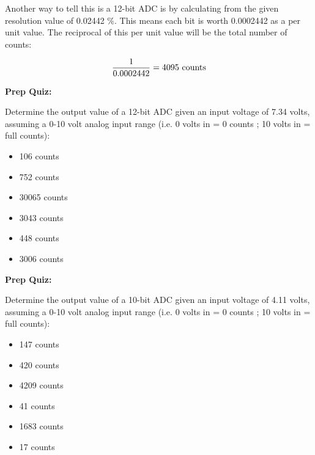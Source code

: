 \vskip 10pt

Another way to tell this is a 12-bit ADC is by calculating from the given resolution value of 0.02442 \%.  This means each bit is worth 0.0002442 as a per unit value.  The reciprocal of this per unit value will be the total number of counts:

$${1 \over 0.0002442} = 4095 \hbox{ counts}$$















\vfil \eject

\noindent
{\bf Prep Quiz:}

Determine the output value of a 12-bit ADC given an input voltage of 7.34 volts, assuming a 0-10 volt analog input range (i.e. 0 volts in = 0 counts ; 10 volts in = full counts):

\begin{itemize}
\item{} 106 counts
\vskip 5pt 
\item{} 752 counts
\vskip 5pt 
\item{} 30065 counts
\vskip 5pt 
\item{} 3043 counts
\vskip 5pt 
\item{} 448 counts
\vskip 5pt 
\item{} 3006 counts
\end{itemize}

\vfil \eject

\noindent
{\bf Prep Quiz:}

Determine the output value of a 10-bit ADC given an input voltage of 4.11 volts, assuming a 0-10 volt analog input range (i.e. 0 volts in = 0 counts ; 10 volts in = full counts):

\begin{itemize}
\item{} 147 counts
\vskip 5pt 
\item{} 420 counts
\vskip 5pt 
\item{} 4209 counts
\vskip 5pt 
\item{} 41 counts
\vskip 5pt 
\item{} 1683 counts
\vskip 5pt 
\item{} 17 counts
\end{itemize}




